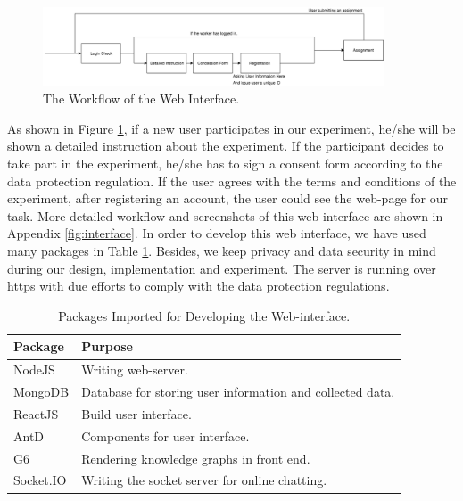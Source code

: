 \documentclass[bsc,frontabs,twoside,singlespacing,parskip,deptreport]{infthesis}     %
\begin{document}
\begin{figure}[h]
    \centering
    \includegraphics[width=0.9\textwidth]{process.png}
    \caption{The Workflow of the Web Interface.}
    \label{fig:web}
\end{figure}

As shown in Figure \ref{fig:web}, if a new user participates in our experiment, he/she will be shown a detailed instruction about the experiment. If the participant decides to take part in the experiment, he/she has to sign a consent form according to the data protection regulation. If the user agrees with the terms and conditions of the experiment, after registering an account, the user could see the web-page for our task. More detailed workflow and screenshots of this web interface are shown in Appendix \ref{fig:interface}. In order to develop this web interface, we have used many packages in Table \ref{tab:packages}. Besides, we keep privacy and data security in mind during our design, implementation and experiment. The server is running over https with due efforts to comply with the data protection regulations.

\begin{table}[]
\centering
\begin{tabular}{|l|l|}
\hline
Package                  & Purpose                                                   \\ \hline
NodeJS \cite{nodejs}      & Writing web-server.                                       \\ \hline
MongoDB \cite{monodb}     & Database for storing user information and collected data. \\ \hline
ReactJS \cite{react}      & Build user interface.                                    \\ \hline
AntD \cite{antd}           & Components for user interface.                  \\ \hline
G6 \cite{g6}              & Rendering knowledge graphs in front end.                   \\ \hline
Socket.IO \cite{socketio} & Writing the socket server for online chatting.                \\ \hline
\end{tabular}
\caption{Packages Imported for Developing the Web-interface.}
\label{tab:packages}
\end{table}
\end{document}
